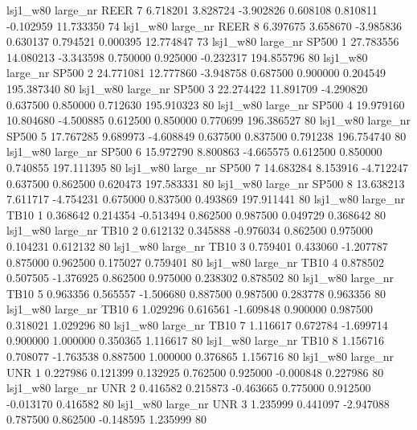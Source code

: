     lsj1_w80   large_nr     REER                 7  6.718201  3.828724  -3.902826 0.608108 0.810811 -0.102959   11.733350 74
    lsj1_w80   large_nr     REER                 8  6.397675  3.658670  -3.985836 0.630137 0.794521  0.000395   12.774847 73
    lsj1_w80   large_nr    SP500                 1 27.783556 14.080213  -3.343598 0.750000 0.925000 -0.232317  194.855796 80
    lsj1_w80   large_nr    SP500                 2 24.771081 12.777860  -3.948758 0.687500 0.900000  0.204549  195.387340 80
    lsj1_w80   large_nr    SP500                 3 22.274422 11.891709  -4.290820 0.637500 0.850000  0.712630  195.910323 80
    lsj1_w80   large_nr    SP500                 4 19.979160 10.804680  -4.500885 0.612500 0.850000  0.770699  196.386527 80
    lsj1_w80   large_nr    SP500                 5 17.767285  9.689973  -4.608849 0.637500 0.837500  0.791238  196.754740 80
    lsj1_w80   large_nr    SP500                 6 15.972790  8.800863  -4.665575 0.612500 0.850000  0.740855  197.111395 80
    lsj1_w80   large_nr    SP500                 7 14.683284  8.153916  -4.712247 0.637500 0.862500  0.620473  197.583331 80
    lsj1_w80   large_nr    SP500                 8 13.638213  7.611717  -4.754231 0.675000 0.837500  0.493869  197.911441 80
    lsj1_w80   large_nr     TB10                 1  0.368642  0.214354  -0.513494 0.862500 0.987500  0.049729    0.368642 80
    lsj1_w80   large_nr     TB10                 2  0.612132  0.345888  -0.976034 0.862500 0.975000  0.104231    0.612132 80
    lsj1_w80   large_nr     TB10                 3  0.759401  0.433060  -1.207787 0.875000 0.962500  0.175027    0.759401 80
    lsj1_w80   large_nr     TB10                 4  0.878502  0.507505  -1.376925 0.862500 0.975000  0.238302    0.878502 80
    lsj1_w80   large_nr     TB10                 5  0.963356  0.565557  -1.506680 0.887500 0.987500  0.283778    0.963356 80
    lsj1_w80   large_nr     TB10                 6  1.029296  0.616561  -1.609848 0.900000 0.987500  0.318021    1.029296 80
    lsj1_w80   large_nr     TB10                 7  1.116617  0.672784  -1.699714 0.900000 1.000000  0.350365    1.116617 80
    lsj1_w80   large_nr     TB10                 8  1.156716  0.708077  -1.763538 0.887500 1.000000  0.376865    1.156716 80
    lsj1_w80   large_nr      UNR                 1  0.227986  0.121399   0.132925 0.762500 0.925000 -0.000848    0.227986 80
    lsj1_w80   large_nr      UNR                 2  0.416582  0.215873  -0.463665 0.775000 0.912500 -0.013170    0.416582 80
    lsj1_w80   large_nr      UNR                 3  1.235999  0.441097  -2.947088 0.787500 0.862500 -0.148595    1.235999 80
